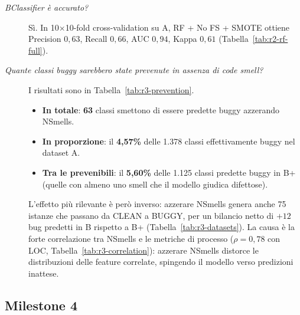 \begin{description}
  \item[\textit{BClassifier è accurato?}]
  Sì. In 10$\times$10-fold cross-validation su A, RF + No FS + SMOTE ottiene Precision
  $0{,}63$, Recall $0{,}66$, AUC $0{,}94$, Kappa $0{,}61$
  (Tabella~\ref{tab:r2-rf-full}).

  \item[\textit{Quante classi buggy sarebbero state prevenute in assenza di code smell?}]
  I risultati sono in Tabella~\ref{tab:r3-prevention}.
  \begin{itemize}[noitemsep]
    \item \textbf{In totale}: \textbf{63} classi smettono di essere predette buggy azzerando NSmells.
    \item \textbf{In proporzione}: il \textbf{4,57\%} delle 1.378 classi effettivamente buggy
          nel dataset A.
    \item \textbf{Tra le prevenibili}: il \textbf{5,60\%} delle 1.125 classi predette
          buggy in B+ (quelle con almeno uno smell che il modello giudica difettose).
  \end{itemize}
  L'effetto più rilevante è però inverso: azzerare NSmells genera anche 75 istanze
  che passano da CLEAN a BUGGY, per un bilancio netto di $+12$ bug predetti in B rispetto
  a B+ (Tabella~\ref{tab:r3-datasets}). La causa è la forte correlazione tra NSmells e le
  metriche di processo ($\rho = 0{,}78$ con LOC, Tabella~\ref{tab:r3-correlation}): azzerare
  NSmells distorce le distribuzioni delle feature correlate, spingendo il modello verso
  predizioni inattese.
\end{description}

\subsection{Milestone 4}

